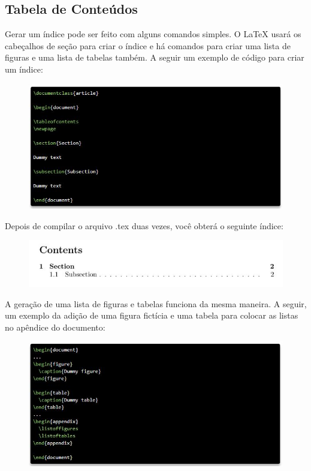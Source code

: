 \documentclass[12pt]{article}
\begin{document}
		
		\subsection{Tabela de Conteúdos}
			Gerar um índice pode ser feito com alguns comandos simples. O LaTeX usará os cabeçalhos de seção para criar o índice e há comandos para criar uma lista de figuras e uma lista de tabelas também. A seguir um exemplo de código para criar um índice:
			\begin{figure} [h]
				\centering
				\includegraphics[scale=0.9]{26.JPG}
			\end{figure}
			
			Depois de compilar o arquivo .tex duas vezes, você obterá o seguinte índice:
			
			\begin{figure} [h]
				\centering
				\includegraphics[scale=0.9]{28.JPG}
			\end{figure}
			\pagebreak
			A geração de uma lista de figuras e tabelas funciona da mesma maneira. A seguir, um exemplo da adição de uma figura fictícia e uma tabela para colocar as listas no apêndice do documento:
			\begin{figure} [h]
				\centering
				\includegraphics[scale=0.9]{27.JPG}
			\end{figure}
			
\end{document}
